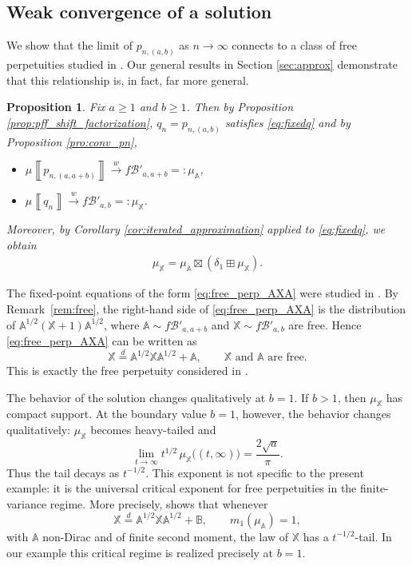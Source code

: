 \documentclass[a4paper,11pt]{amsart}
\numberwithin{equation}{section}
\newtheorem{proposition}[theorem]{Proposition}
\newcommand{\weak}{\xrightarrow{w}}
\def \X {{\mathbb X}}
\def \A {{\mathbb A}}
\def \B {{\mathbb B}}
\newcommand{\meas}[1]{\mu\! \left\llbracket #1 \right\rrbracket}
\begin{document}
\subsection{Weak convergence of a solution}
We show that the limit of $p_{n,(a,b)}$ as $n\to\infty$ connects to a class of free perpetuities studied in \cite{FreePerp}. Our general results in Section \ref{sec:approx} demonstrate that this relationship is, in fact, far more general.

\begin{proposition}
Fix \(a\geq 1\) and \(b\ge 1\). Then by Proposition \ref{prop:pff_shift_factorization}, $q_n=p_{n,(a,b)}$ satisfies \eqref{eq:fixedq} and by Proposition \ref{pro:conv_pn},
\begin{itemize}
    \item[(i)] $\meas{p_{n,(a,a+b)}}\weak  f\mathcal{B}'_{a,a+b}=:\mu_{\A}$,
    \item[(ii)] $\meas{q_n}\weak f\mathcal{B}'_{a,b}=:\mu_{\X}$.
\end{itemize}
Moreover, by Corollary \ref{cor:iterated_approximation} applied to  \eqref{eq:fixedq}, we obtain 
\begin{align}\label{eq:free_perp_AXA}
\mu_\X = \mu_{\A}\boxtimes (\delta_1\boxplus \mu_{\X}).
\end{align}
\end{proposition}


The fixed-point equations of the form \eqref{eq:free_perp_AXA} were studied in \cite{FreePerp}. By Remark~\ref{rem:free}, the right-hand side of \eqref{eq:free_perp_AXA} is the distribution of $\A^{1/2}(\X+1)\A^{1/2}$,
where \(\A\sim f\mathcal{B}'_{a,a+b}\) and \(\X\sim f\mathcal{B}'_{a,b}\) are free. Hence \eqref{eq:free_perp_AXA} can be written as
\[
\X \stackrel{d}{=} \A^{1/2}\X \A^{1/2} + \A,
\qquad \X \text{ and } \A \text{ are free}.
\]
This is exactly the free perpetuity considered in \cite[Section 1.5]{FreePerp}.

The behavior of the solution changes qualitatively at \(b=1\). 
If \(b>1\), then \(\mu_\X\) has compact support. At the boundary value \(b=1\), however, the behavior changes qualitatively: \(\mu_\X\) becomes heavy-tailed and
\[
\lim_{t\to\infty} t^{1/2}\,\mu_{\X}\bigl((t,\infty)\bigr)=\frac{2\sqrt a}{\pi}.
\]
Thus the tail decays as \(t^{-1/2}\). This exponent is not specific to the present example: it is the universal critical exponent for free perpetuities in the finite-variance regime. More precisely, \cite[Theorem 1.5]{FreePerp} shows that whenever
\[
\X \stackrel{d}{=} \A^{1/2}\X\A^{1/2}+\B,
\qquad m_1(\mu_\A)=1,
\]
with \(\A\) non-Dirac and of finite second moment, the law of \(\X\) has a \(t^{-1/2}\)-tail. In our example this critical regime is realized precisely at \(b=1\).
\end{document}
